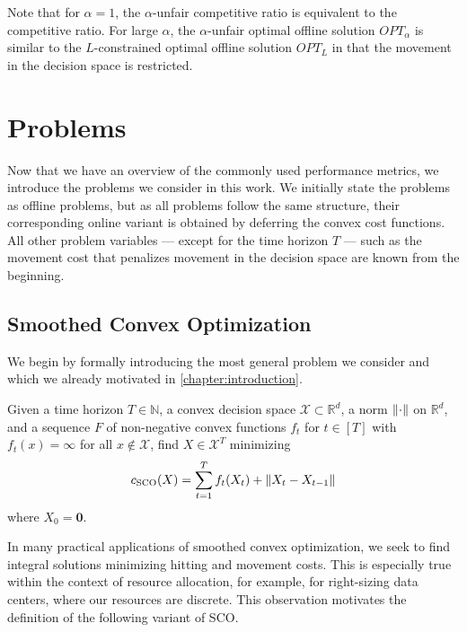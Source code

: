 Note that for $\alpha = 1$, the $\alpha$-unfair competitive ratio is equivalent to the competitive ratio. For large $\alpha$, the $\alpha$-unfair optimal offline solution $OPT_{\alpha}$ is similar to the $L$-constrained optimal offline solution $OPT_L$ in that the movement in the decision space is restricted.

\section{Problems}

Now that we have an overview of the commonly used performance metrics, we introduce the problems we consider in this work. We initially state the problems as offline problems, but as all problems follow the same structure, their corresponding online variant is obtained by deferring the convex cost functions. All other problem variables --- except for the time horizon $T$ --- such as the movement cost that penalizes movement in the decision space are known from the beginning.

\subsection{Smoothed Convex Optimization}

We begin by formally introducing the most general problem we consider and which we already motivated in \cref{chapter:introduction}.

\begin{problem}\label{problem:smoothed_convex_optimization}
Given a time horizon $T \in \mathbb{N}$, a convex decision space $\mathcal{X} \subset \mathbb{R}^d$, a norm $\lVert\cdot\rVert$ on $\mathbb{R}^d$, and a sequence $F$ of non-negative convex functions $f_t$ for $t \in [T]$ with $f_t(x) = \infty$ for all $x \not\in \mathcal{X}$, find $X \in \mathcal{X}^T$ minimizing \begin{align*}
    c_{\text{SCO}}(X) = \sum_{t=1}^T f_t(X_t) + \lVert X_t - X_{t-1}\rVert
\end{align*}
where $X_0 = \mathbf{0}$.
\end{problem}

In many practical applications of smoothed convex optimization, we seek to find integral solutions minimizing hitting and movement costs. This is especially true within the context of resource allocation, for example, for right-sizing data centers, where our resources are discrete. This observation motivates the definition of the following variant of SCO.

